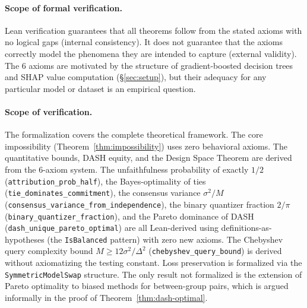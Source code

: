 \documentclass{article}
\begin{document}
\paragraph{Scope of formal verification.}
Lean verification guarantees that all theorems follow from the stated axioms with no logical gaps (internal consistency). It does not guarantee that the axioms correctly model the phenomena they are intended to capture (external validity). The 6 axioms are motivated by the structure of gradient-boosted decision trees and SHAP value computation (\S\ref{sec:setup}), but their adequacy for any particular model or dataset is an empirical question.

\paragraph{Scope of verification.}
\begin{sloppypar}
The formalization covers the complete theoretical framework. The core impossibility
(Theorem~\ref{thm:impossibility}) uses zero behavioral axioms. The quantitative
bounds, DASH equity, and the Design Space Theorem are derived from the 6-axiom
system. The unfaithfulness probability of exactly $1/2$
(\texttt{attribution\allowbreak\_prob\allowbreak\_half}), the Bayes-optimality of
ties (\texttt{tie\allowbreak\_dominates\allowbreak\_commitment}), the consensus
variance $\sigma^2/M$
(\texttt{consensus\allowbreak\_variance\allowbreak\_from\allowbreak\_independence}),
the binary quantizer fraction $2/\pi$
(\texttt{binary\allowbreak\_quantizer\allowbreak\_fraction}), and the Pareto
dominance of DASH (\texttt{dash\allowbreak\_unique\allowbreak\_pareto\allowbreak\_optimal})
are all Lean-derived using definitions-as-hypotheses (the \texttt{IsBalanced}
pattern) with zero new axioms. The Chebyshev query complexity bound
$M \geq 12\sigma^2/\Delta^2$
(\texttt{chebyshev\allowbreak\_query\allowbreak\_bound}) is derived without
axiomatizing the testing constant. Loss preservation is formalized via the
\texttt{SymmetricModelSwap} structure. The only result not formalized is the
extension of Pareto optimality to biased methods for between-group pairs, which
is argued informally in the proof of Theorem~\ref{thm:dash-optimal}.
\end{sloppypar}
\end{document}
